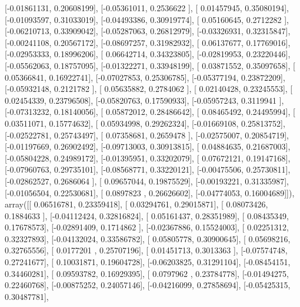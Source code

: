 \documentclass{article}
\begin{document}
       [-0.01861131,  0.20608199],
       [-0.05361011,  0.2536622 ],
       [ 0.01457945,  0.35080194],
       [-0.01093597,  0.31033019],
       [-0.04493386,  0.30919774],
       [ 0.05160645,  0.2712282 ],
       [-0.06210713,  0.33909042],
       [-0.05287063,  0.26812979],
       [-0.03326931,  0.32315847],
       [-0.00241108,  0.20567172],
       [-0.08697257,  0.31982932],
       [ 0.06137677,  0.17769016],
       [-0.02953333,  0.18996206],
       [ 0.06642714,  0.34323805],
       [-0.02819953,  0.23220446],
       [-0.05562063,  0.18757095],
       [-0.01322271,  0.33948199],
       [ 0.03871552,  0.35097658],
       [ 0.05366841,  0.16922741],
       [-0.07027853,  0.25306785],
       [-0.05377194,  0.23872209],
       [-0.05932148,  0.2121782 ],
       [ 0.05635882,  0.2784062 ],
       [ 0.02140428,  0.23245553],
       [ 0.02454339,  0.23796508],
       [-0.05820763,  0.17590933],
       [-0.05957243,  0.3119941 ],
       [-0.07313232,  0.18140056],
       [ 0.05872012,  0.28486642],
       [ 0.08465492,  0.24495994],
       [ 0.03511071,  0.15774632],
       [ 0.05934998,  0.29262324],
       [-0.01669108,  0.25813752],
       [-0.02522781,  0.25743497],
       [ 0.07358681,  0.2659478 ],
       [-0.02575007,  0.20854719],
       [-0.01197669,  0.26902492],
       [-0.09713003,  0.30913815],
       [ 0.04884635,  0.21687003],
       [-0.05804228,  0.24989172],
       [-0.01395951,  0.33202079],
       [ 0.07672121,  0.19147168],
       [-0.07960763,  0.29735101],
       [-0.08568771,  0.33220121],
       [-0.00475506,  0.25730811],
       [-0.02862527,  0.2686064 ],
       [ 0.09657044,  0.19875529],
       [-0.00193221,  0.31335987],
       [-0.01056504,  0.22530681],
       [ 0.0897823 ,  0.26626602],
       [-0.04774053,  0.16004689]]), array([[ 0.06516781,  0.23359418],
       [ 0.03294761,  0.29015871],
       [ 0.08073426,  0.1884633 ],
       [-0.04112424,  0.32816824],
       [ 0.05161437,  0.28351989],
       [ 0.08435349,  0.17678573],
       [-0.02891409,  0.1714862 ],
       [-0.02367886,  0.15524003],
       [ 0.02251312,  0.32327893],
       [-0.04132024,  0.33586782],
       [ 0.05805778,  0.30900645],
       [ 0.05698216,  0.32765556],
       [ 0.0177201 ,  0.25707196],
       [ 0.01451713,  0.3013363 ],
       [-0.07574748,  0.27241677],
       [ 0.10031871,  0.19604728],
       [-0.06203825,  0.31291104],
       [-0.08454151,  0.34460281],
       [ 0.09593782,  0.16929395],
       [ 0.0797962 ,  0.23784778],
       [-0.01494275,  0.22460768],
       [-0.00875252,  0.24057146],
       [-0.04216099,  0.27858694],
       [-0.05425315,  0.30487781],
\end{document}
